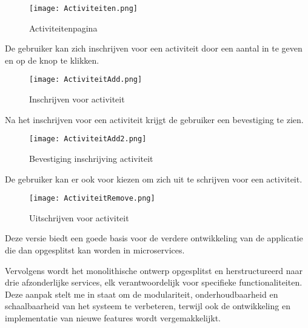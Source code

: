 \begin{figure}[H]
    \centering	
    \texttt{[image: Activiteiten.png]} 
    \caption{Activiteitenpagina} 
    \label{fig:activities}
\end{figure}

De gebruiker kan zich inschrijven voor een activiteit door een aantal in te geven en op de knop te klikken.

\begin{figure}[H]
    \centering	
    \texttt{[image: ActiviteitAdd.png]} 
    \caption{Inschrijven voor activiteit} 
    \label{fig:subscribe}
\end{figure}

Na het inschrijven voor een activiteit krijgt de gebruiker een bevestiging te zien.

\begin{figure}[H]
    \centering	
    \texttt{[image: ActiviteitAdd2.png]} 
    \caption{Bevestiging inschrijving activiteit} 
    \label{fig:confirm}
\end{figure}

De gebruiker kan er ook voor kiezen om zich uit te schrijven voor een activiteit.

\begin{figure}[H]
    \centering	
    \texttt{[image: ActiviteitRemove.png]} 
    \caption{Uitschrijven voor activiteit} 
    \label{fig:unsubscribe}
\end{figure}

Deze versie biedt een goede basis voor de verdere ontwikkeling van de applicatie die dan opgesplitst kan worden in microservices.

Vervolgens wordt het monolithische ontwerp opgesplitst en herstructureerd naar drie afzonderlijke services, elk verantwoordelijk voor specifieke functionaliteiten. Deze aanpak stelt me in staat om de modulariteit, onderhoudbaarheid en schaalbaarheid van het systeem te verbeteren, terwijl ook de ontwikkeling en implementatie van nieuwe features wordt vergemakkelijkt.

